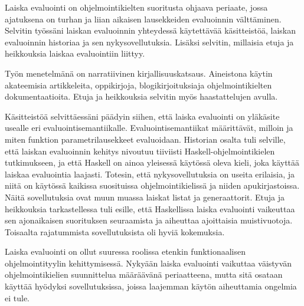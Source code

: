 \begin{fiabstract}
Laiska evaluointi on ohjelmointikielten suoritusta ohjaava periaate, jossa ajatuksena on turhan ja liian aikaisen lausekkeiden evaluoinnin välttäminen. Selvitin työssäni laiskan evaluoinnin yhteydessä käytettävää käsitteistöä, laiskan evaluoinnin historiaa ja sen nykysovellutuksia. Lisäksi selvitin, millaisia etuja ja heikkouksia laiskaa evaluointiin liittyy.

Työn menetelmänä on narratiivinen kirjallisuuskatsaus. Aineistona käytin akateemisia artikkeleita, oppikirjoja, blogikirjoituksiaja ohjelmointikielten dokumentaatioita. Etuja ja heikkouksia selvitin myös haastattelujen avulla.

Käsitteistöä selvittäessäni päädyin siihen, että laiska evaluointi on yläkäsite usealle eri evaluointisemantiikalle. Evaluointisemantiikat määrittävät, milloin ja miten funktion parametrilausekkeet evaluoidaan. Historian osalta tuli selville, että laiskan evaluoinnin kehitys nivoutuu tiiviisti Haskell-ohjelmointikielen tutkimukseen, ja että Haskell on ainoa yleisessä käytössä oleva kieli, joka käyttää laiskaa evaluointia laajasti. Totesin, että nykysovellutuksia on useita erilaisia, ja niitä on käytössä kaikissa suosituissa ohjelmointikielissä ja niiden apukirjastoissa. Näitä sovellutuksia ovat muun muassa laiskat listat ja generaattorit. Etuja ja heikkouksia tarkastellessa tuli esille, että Haskellissa laiska evaluointi vaikeuttaa sen ajonaikaisen suorituksen seuraamista ja aiheuttaa ajoittaisia muistivuotoja. Toisaalta rajatummista sovellutuksista oli hyviä kokemuksia.

Laiska evaluointi on ollut suuressa roolissa etenkin funktionaalisen ohjelmointityylin kehittymisessä. Nykyään laiska evaluointi vaikuttaa väistyvän ohjelmointikielien suunnittelua määräävänä periaatteena, mutta sitä osataan käyttää hyödyksi sovellutuksissa, joissa laajemman käytön aiheuttamia ongelmia ei tule.


%
\end{fiabstract}


